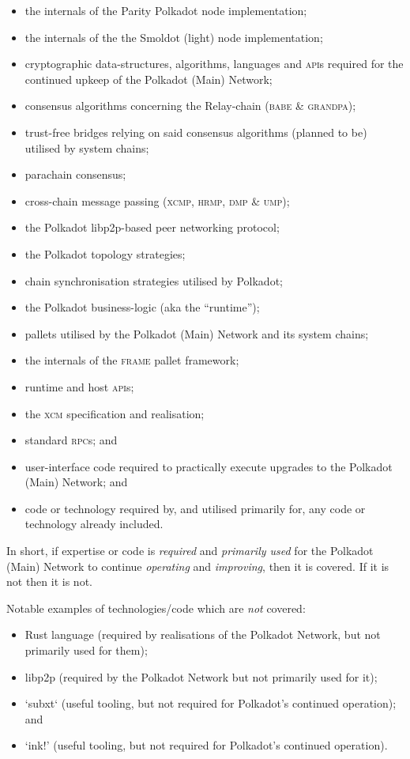 \documentclass[9pt,oneside]{amsart}
\begin{document}
\begin{itemize}
 \item the internals of the Parity Polkadot node implementation;
 \item the internals of the the Smoldot (light) node implementation;
 \item cryptographic data-structures, algorithms, languages and \textsc{api}s required for the continued upkeep of the Polkadot (Main) Network;
 \item consensus algorithms concerning the Relay-chain (\textsc{babe} \& \textsc{grandpa});
 \item trust-free bridges relying on said consensus algorithms (planned to be) utilised by system chains;
 \item parachain consensus;
 \item cross-chain message passing (\textsc{xcmp}, \textsc{hrmp}, \textsc{dmp} \& \textsc{ump});
 \item the Polkadot libp2p-based peer networking protocol;
 \item the Polkadot topology strategies;
 \item chain synchronisation strategies utilised by Polkadot;
 \item the Polkadot business-logic (aka the ``runtime'');
 \item pallets utilised by the Polkadot (Main) Network and its system chains;
 \item the internals of the \textsc{frame} pallet framework;
 \item runtime and host \textsc{api}s;
 \item the \textsc{xcm} specification and realisation;
 \item standard \textsc{rpc}s; and
 \item user-interface code required to practically execute upgrades to the Polkadot (Main) Network; and
 \item code or technology required by, and utilised primarily for, any code or technology already included.
\end{itemize}

In short, if expertise or code is \emph{required} and \emph{primarily used} for the Polkadot (Main) Network to continue \emph{operating} and \emph{improving}, then it is covered. If it is not then it is not.

Notable examples of technologies/code which are \emph{not} covered:

\begin{itemize}
  \item Rust language (required by realisations of the Polkadot Network, but not primarily used for them);
  \item libp2p (required by the Polkadot Network but not primarily used for it);
  \item `subxt` (useful tooling, but not required for Polkadot's continued operation); and
  \item `ink!' (useful tooling, but not required for Polkadot's continued operation).
\end{itemize}
\end{document}

